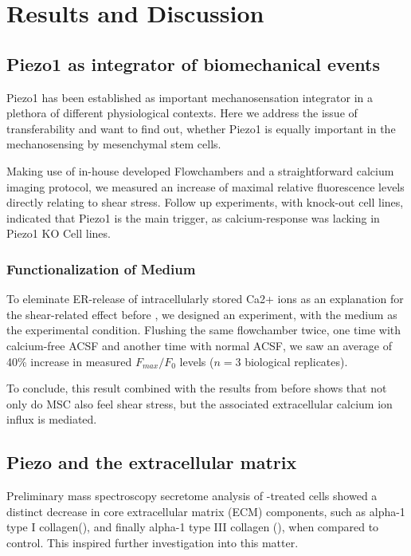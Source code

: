 \chapter{Results and Discussion}


\section{Piezo1 as integrator of biomechanical events}

Piezo1 has been established as important mechanosensation integrator\cite{Murthy2017PiezosTU}  in a plethora of different physiological contexts. Here we address the issue of transferability and want to find out, whether Piezo1 is equally important in the mechanosensing by mesenchymal stem cells.

Making use of in-house developed Flowchambers and a straightforward calcium imaging protocol, we measured an increase of maximal relative fluorescence levels directly relating to shear stress. Follow up experiments, with knock-out cell lines, indicated that Piezo1 is the main trigger, as calcium-response was lacking in  Piezo1 KO Cell lines.


\subsection{Functionalization of Medium}
To eleminate ER-release of intracellularly stored Ca2+ ions as an explanation for the shear-related effect before , we designed an experiment, with the medium as the experimental condition. Flushing the same flowchamber twice, one time with calcium-free ACSF and another time with normal ACSF, we saw an average of 40\% increase in measured $F_{max}/F_{0}$ levels ($n=3$ biological replicates).\par
To conclude, this result combined with the results from before shows that not only do MSC also feel shear stress, but the associated extracellular calcium ion influx is \Piezo mediated. 


\section{Piezo and the extracellular matrix}

Preliminary mass spectroscopy secretome analysis of \Yoda-treated cells showed a distinct decrease in core extracellular matrix (ECM) components, such as alpha-1 type I collagen(\colone),  and finally alpha-1 type III collagen (\colthree), when compared to control.
This inspired further investigation into this matter.

